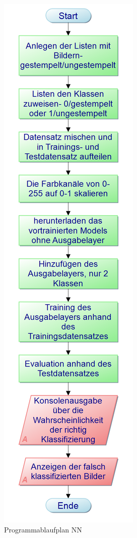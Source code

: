 \documentclass[12pt,toc=bib,toc=listof]{scrreprt}
\begin{document}
\begin{figure}[h]
\begin{minipage}[t]{.24\linewidth}
  \includegraphics[width=\linewidth]{./bilder/Mobilenet}
  \caption{Programmablaufplan NN}
  \label{fig:nn_pap}
\end{minipage}
\end{figure}
\end{document}

